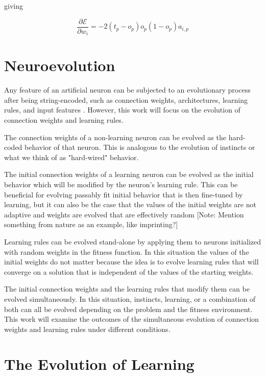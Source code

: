 \documentclass[master]{outhesis}
\begin{document}
giving

\begin{equation}
\frac{\partial \mathcal{E}}{\partial w_i} = -2(t_p - o_p)o_p(1 - o_p)a_{i,p}
\end{equation}

\section{Neuroevolution}

Any feature of an artificial neuron can be subjected to an evolutionary process after being string-encoded,
such as connection weights, architectures, learning rules, and input features \cite{Yao:1999lp}.
However, this work will focus on the evolution of connection weights and learning rules.

The connection weights of a non-learning neuron can be evolved as the hard-coded behavior of that neuron. 
This is analogous to the evolution of instincts or what we think of as "hard-wired" behavior.

The initial connection weights of a learning neuron can be evolved as the initial behavior which will be modified by the neuron's learning rule.
This can be beneficial for evolving passably fit initial behavior that is then fine-tuned by learning,
but it can also be the case that the values of the initial weights are not adaptive and weights are evolved that are effectively random 
[Note: Mention something from nature as an example, like imprinting?]

Learning rules can be evolved stand-alone by applying them to neurons initialized with random weights in the fitness function.
In this situation the values of the initial weights do not matter because the idea is to evolve learning rules that will converge on a solution that is independent of the values of the starting weights.

The initial connection weights and the learning rules that modify them can be evolved simultaneously.
In this situation, instincts, learning, or a combination of both can all be evolved depending on the problem and the fitness environment.
This work will examine the outcomes of the simultaneous evolution of connection weights and learning rules under different conditions.

\section{The Evolution of Learning}
\end{document}

